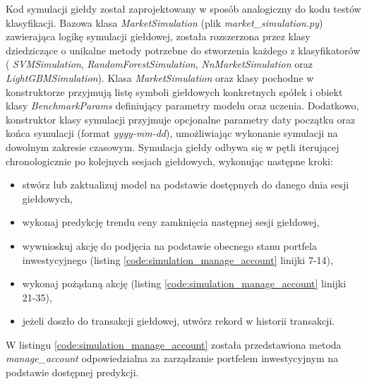 \documentclass[a4paper, twoside, 11pt, openright]{article}
\begin{document}
Kod symulacji giełdy został zaprojektowany w sposób analogiczny do kodu testów klasyfikacji. Bazowa klasa \textit{MarketSimulation} (plik \textit{market\_simulation.py}) zawierająca logikę symulacji giełdowej, została rozszerzona przez klasy dziedziczące o unikalne metody potrzebne do stworzenia każdego z klasyfikatorów ( \textit{SVMSimulation}, \textit{RandomForestSimulation}, \textit{NnMarketSimulation} oraz \textit{LightGBMSimulation}). Klasa \textit{MarketSimulation} oraz klasy pochodne w konstruktorze przyjmują listę symboli giełdowych konkretnych spółek i obiekt klasy \textit{BenchmarkParams} definiujący parametry modelu oraz uczenia. Dodatkowo, konstruktor klasy symulacji przyjmuje opcjonalne parametry daty początku oraz końca symulacji (format \textit{yyyy-mm-dd}), umożliwiając wykonanie symulacji na dowolnym zakresie czasowym. Symulacja giełdy odbywa się w pętli iterującej chronologicznie po kolejnych sesjach giełdowych, wykonując następne kroki:
\begin{itemize}
\item stwórz lub zaktualizuj model na podstawie dostępnych do danego dnia sesji giełdowych,
\item wykonaj predykcję trendu ceny zamknięcia następnej sesji giełdowej,
\item wywnioskuj akcję do podjęcia na podstawie obecnego stanu portfela inwestycyjnego (listing  \ref{code:simulation_manage_account} linijki 7-14),
\item wykonaj pożądaną akcję (listing  \ref{code:simulation_manage_account} linijki 21-35),
\item jeżeli doszło do transakcji giełdowej, utwórz rekord w historii transakcji.
\end{itemize}

 W listingu \ref{code:simulation_manage_account} została przedstawiona metoda \textit{manage\_account} odpowiedzialna za zarządzanie portfelem inwestycyjnym na podstawie dostępnej predykcji.
\end{document}
